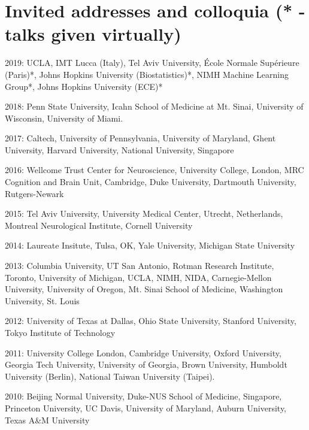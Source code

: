 \section*{Invited addresses and colloquia (* - talks given virtually)}
\noindent

2019:  UCLA, IMT Lucca (Italy), Tel Aviv University, École Normale Supérieure (Paris)*, Johns Hopkins University (Biostatistics)*,  NIMH Machine Learning Group*, Johns Hopkins University (ECE)* \vspace{2mm}

2018:  Penn State University, Icahn School of Medicine at Mt. Sinai, University of Wisconsin, University of Miami. \vspace{2mm}

2017:  Caltech, University of Pennsylvania, University of Maryland, Ghent University, Harvard University, National University, Singapore \vspace{2mm}

2016:  Wellcome Trust Center for Neuroscience, University College, London, MRC Cognition and Brain Unit, Cambridge, Duke University, Dartmouth University, Rutgers-Newark \vspace{2mm}

2015:  Tel Aviv University, University Medical Center, Utrecht, Netherlands, Montreal Neurological Institute, Cornell University \vspace{2mm}

2014:  Laureate Insitute, Tulsa, OK, Yale University, Michigan State University \vspace{2mm}

2013:  Columbia University, UT San Antonio, Rotman Research Institute, Toronto, University of Michigan, UCLA, NIMH, NIDA, Carnegie-Mellon University, University of Oregon, Mt. Sinai School of Medicine, Washington University, St. Louis\vspace{2mm}

2012:  University of Texas at Dallas, Ohio State University, Stanford University, Tokyo Institute of Technology\vspace{2mm}

2011:  University College London, Cambridge University, Oxford University, Georgia Tech University, University of Georgia, Brown University, Humboldt University (Berlin), National Taiwan University (Taipei).\vspace{2mm}

2010:  Beijing Normal University, Duke-NUS School of Medicine, Singapore, Princeton University, UC Davis, University of Maryland, Auburn University, Texas A\&M University \vspace{2mm}

